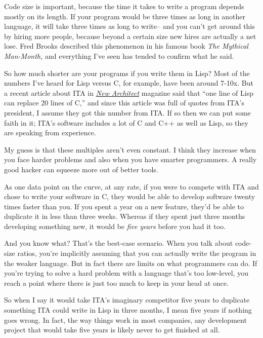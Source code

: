 Code size is important, because the time it takes to write a program
depends mostly on its length. If your program would be three times as
long in another language, it will take three times as long to write--
and you can't get around this by hiring more people, because beyond a
certain size new hires are actually a net lose. Fred Brooks described
this phenomenon in his famous book \emph{The Mythical Man-Month,} and
everything I've seen has tended to confirm what he said.

So how much shorter are your programs if you write them in Lisp? Most of
the numbers I've heard for Lisp versus C, for example, have been around
7-10x. But a recent article about ITA in
\href{http://www.newarchitectmag.com/documents/s=2286/new1015626014044/}{\emph{New
Architect}} magazine said that ``one line of Lisp can replace 20 lines
of C,'' and since this article was full of quotes from ITA's president,
I assume they got this number from ITA. If so then we can put some faith
in it; ITA's software includes a lot of C and C++ as well as Lisp, so
they are speaking from experience.

My guess is that these multiples aren't even constant. I think they
increase when you face harder problems and also when you have smarter
programmers. A really good hacker can squeeze more out of better tools.

As one data point on the curve, at any rate, if you were to compete with
ITA and chose to write your software in C, they would be able to develop
software twenty times faster than you. If you spent a year on a new
feature, they'd be able to duplicate it in less than three weeks.
Whereas if they spent just three months developing something new, it
would be \emph{five years} before you had it too.

And you know what? That's the best-case scenario. When you talk about
code-size ratios, you're implicitly assuming that you can actually write
the program in the weaker language. But in fact there are limits on what
programmers can do. If you're trying to solve a hard problem with a
language that's too low-level, you reach a point where there is just too
much to keep in your head at once.

So when I say it would take ITA's imaginary competitor five years to
duplicate something ITA could write in Lisp in three months, I mean five
years if nothing goes wrong. In fact, the way things work in most
companies, any development project that would take five years is likely
never to get finished at all.

